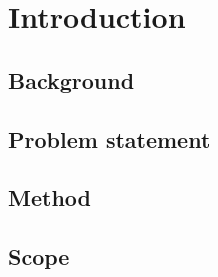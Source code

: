 \chapter{Introduction}\label{chap:intro}

\section{Background}

\section{Problem statement}

\section{Method}

\section{Scope}